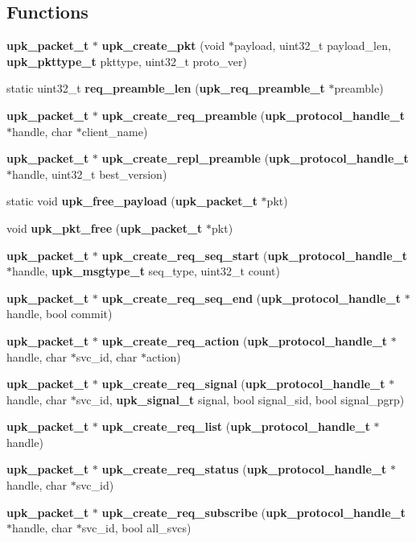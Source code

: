 \subsection*{Functions}
\begin{DoxyCompactItemize}
\item 
{\bf upk\_\-packet\_\-t} $\ast$ {\bf upk\_\-create\_\-pkt} (void $\ast$payload, uint32\_\-t payload\_\-len, {\bf upk\_\-pkttype\_\-t} pkttype, uint32\_\-t proto\_\-ver)
\item 
static uint32\_\-t {\bf req\_\-preamble\_\-len} ({\bf upk\_\-req\_\-preamble\_\-t} $\ast$preamble)
\item 
{\bf upk\_\-packet\_\-t} $\ast$ {\bf upk\_\-create\_\-req\_\-preamble} ({\bf upk\_\-protocol\_\-handle\_\-t} $\ast$handle, char $\ast$client\_\-name)
\item 
{\bf upk\_\-packet\_\-t} $\ast$ {\bf upk\_\-create\_\-repl\_\-preamble} ({\bf upk\_\-protocol\_\-handle\_\-t} $\ast$handle, uint32\_\-t best\_\-version)
\item 
static void {\bf upk\_\-free\_\-payload} ({\bf upk\_\-packet\_\-t} $\ast$pkt)
\item 
void {\bf upk\_\-pkt\_\-free} ({\bf upk\_\-packet\_\-t} $\ast$pkt)
\item 
{\bf upk\_\-packet\_\-t} $\ast$ {\bf upk\_\-create\_\-req\_\-seq\_\-start} ({\bf upk\_\-protocol\_\-handle\_\-t} $\ast$handle, {\bf upk\_\-msgtype\_\-t} seq\_\-type, uint32\_\-t count)
\item 
{\bf upk\_\-packet\_\-t} $\ast$ {\bf upk\_\-create\_\-req\_\-seq\_\-end} ({\bf upk\_\-protocol\_\-handle\_\-t} $\ast$handle, bool commit)
\item 
{\bf upk\_\-packet\_\-t} $\ast$ {\bf upk\_\-create\_\-req\_\-action} ({\bf upk\_\-protocol\_\-handle\_\-t} $\ast$handle, char $\ast$svc\_\-id, char $\ast$action)
\item 
{\bf upk\_\-packet\_\-t} $\ast$ {\bf upk\_\-create\_\-req\_\-signal} ({\bf upk\_\-protocol\_\-handle\_\-t} $\ast$handle, char $\ast$svc\_\-id, {\bf upk\_\-signal\_\-t} signal, bool signal\_\-sid, bool signal\_\-pgrp)
\item 
{\bf upk\_\-packet\_\-t} $\ast$ {\bf upk\_\-create\_\-req\_\-list} ({\bf upk\_\-protocol\_\-handle\_\-t} $\ast$handle)
\item 
{\bf upk\_\-packet\_\-t} $\ast$ {\bf upk\_\-create\_\-req\_\-status} ({\bf upk\_\-protocol\_\-handle\_\-t} $\ast$handle, char $\ast$svc\_\-id)
\item 
{\bf upk\_\-packet\_\-t} $\ast$ {\bf upk\_\-create\_\-req\_\-subscribe} ({\bf upk\_\-protocol\_\-handle\_\-t} $\ast$handle, char $\ast$svc\_\-id, bool all\_\-svcs)

\end{DoxyCompactItemize}
